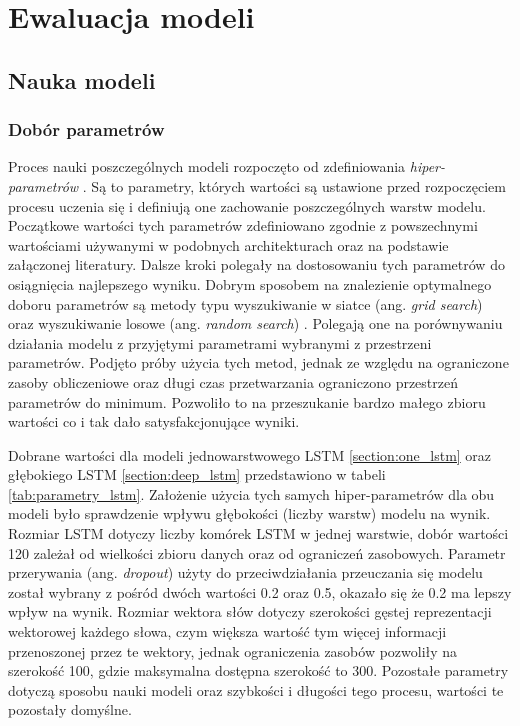 \chapter{Ewaluacja modeli}

\section{Nauka modeli}

\subsection{Dobór parametrów}

Proces nauki poszczególnych modeli rozpoczęto od zdefiniowania \textit{hiper-parametrów} \cite{probst2018tunability}. Są to parametry, których wartości są ustawione przed rozpoczęciem procesu uczenia się i definiują one zachowanie poszczególnych warstw modelu. Początkowe wartości tych parametrów zdefiniowano zgodnie z powszechnymi wartościami używanymi w podobnych architekturach oraz na podstawie załączonej literatury. Dalsze kroki polegały na dostosowaniu tych parametrów do osiągnięcia najlepszego wyniku. Dobrym sposobem na znalezienie optymalnego doboru parametrów są metody typu wyszukiwanie w siatce (ang. \textit{grid search}) oraz wyszukiwanie losowe (ang. \textit{random search}) \cite{liashchynskyi2019grid}. Polegają one na porównywaniu działania modelu z przyjętymi parametrami wybranymi z przestrzeni parametrów. Podjęto próby użycia tych metod, jednak ze względu na ograniczone zasoby obliczeniowe oraz długi czas przetwarzania ograniczono przestrzeń parametrów do minimum. Pozwoliło to na przeszukanie bardzo małego zbioru wartości co i tak dało satysfakcjonujące wyniki.

Dobrane wartości dla modeli jednowarstwowego LSTM \ref{section:one_lstm} oraz głębokiego LSTM \ref{section:deep_lstm} przedstawiono w tabeli \ref{tab:parametry_lstm}. Założenie użycia tych samych hiper-parametrów dla obu modeli było sprawdzenie wpływu głębokości (liczby warstw) modelu na wynik. Rozmiar LSTM dotyczy liczby komórek LSTM w jednej warstwie, dobór wartości 120 zależał od wielkości zbioru danych oraz od ograniczeń zasobowych. Parametr przerywania (ang. \textit{dropout}) użyty do przeciwdziałania przeuczania się modelu został wybrany z pośród dwóch wartości 0.2 oraz 0.5, okazało się że 0.2 ma lepszy wpływ na wynik. Rozmiar wektora słów dotyczy szerokości gęstej reprezentacji wektorowej każdego słowa, czym większa wartość tym więcej informacji przenoszonej przez te wektory, jednak ograniczenia zasobów pozwoliły na szerokość 100, gdzie maksymalna dostępna szerokość to 300. Pozostałe parametry dotyczą sposobu nauki modeli oraz szybkości i długości tego procesu, wartości te pozostały domyślne.

